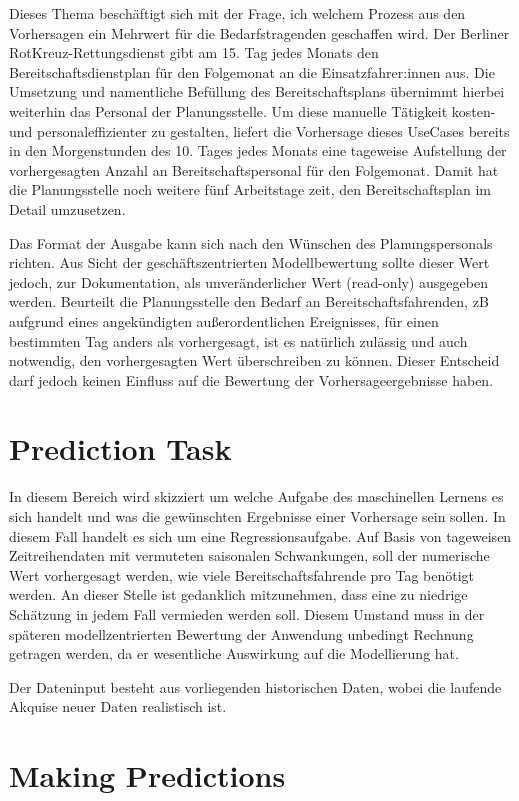 Dieses Thema beschäftigt sich mit der Frage, ich welchem Prozess aus den Vorhersagen ein Mehrwert für die Bedarfstragenden geschaffen wird. Der Berliner RotKreuz-Rettungsdienst gibt am 15. Tag jedes Monats den Bereitschaftsdienstplan für den Folgemonat an die Einsatzfahrer:innen aus. Die Umsetzung und namentliche Befüllung des Bereitschaftsplans übernimmt hierbei weiterhin das Personal der Planungsstelle. Um diese manuelle Tätigkeit kosten- und personaleffizienter zu gestalten, liefert die Vorhersage dieses UseCases bereits in den Morgenstunden des 10. Tages jedes Monats eine tageweise Aufstellung der vorhergesagten Anzahl an Bereitschaftspersonal für den Folgemonat. Damit hat die Planungsstelle noch weitere fünf Arbeitstage zeit, den Bereitschaftsplan im Detail umzusetzen.

Das Format der Ausgabe kann sich nach den Wünschen des Planungspersonals richten. Aus Sicht der geschäftszentrierten Modellbewertung sollte dieser Wert jedoch, zur Dokumentation, als unveränderlicher Wert (read-only) ausgegeben werden. Beurteilt die Planungsstelle den Bedarf an Bereitschaftsfahrenden, zB aufgrund eines angekündigten außerordentlichen Ereignisses, für einen bestimmten Tag anders als vorhergesagt, ist es natürlich zulässig und auch notwendig, den vorhergesagten Wert überschreiben zu können. Dieser Entscheid darf jedoch keinen Einfluss auf die Bewertung der Vorhersageergebnisse haben.


\section{Prediction Task}

In diesem Bereich wird skizziert um welche Aufgabe des maschinellen Lernens es sich handelt und was die gewünschten Ergebnisse einer Vorhersage sein sollen. In diesem Fall handelt es sich um eine Regressionsaufgabe. Auf Basis von tageweisen Zeitreihendaten mit vermuteten saisonalen Schwankungen, soll der numerische Wert vorhergesagt werden, wie viele Bereitschaftsfahrende pro Tag benötigt werden. An dieser Stelle ist gedanklich mitzunehmen, dass eine zu niedrige Schätzung in jedem Fall vermieden werden soll. Diesem Umstand muss in der späteren modellzentrierten Bewertung der Anwendung unbedingt Rechnung getragen werden, da er wesentliche Auswirkung auf die Modellierung hat. 

Der Dateninput besteht aus vorliegenden historischen Daten, wobei die laufende Akquise neuer Daten realistisch ist.

\section{Making Predictions}

